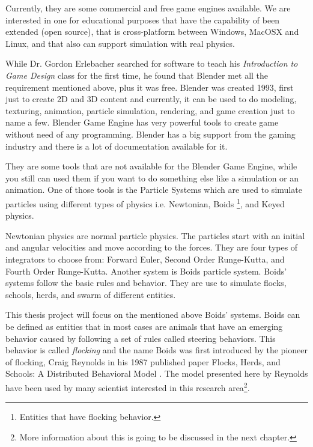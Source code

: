 
Currently, they are some commercial and free game engines available. We are interested in one for educational purposes that have the capability of been extended (open source), that is cross-platform between Windows, MacOSX and Linux, and that also can support simulation with real physics. 


While Dr. Gordon Erlebacher searched for software to teach his \textit{Introduction to Game Design} class for the first time, he found that Blender \cite{?} met all the requirement mentioned above, plus it was free. Blender was created 1993, first just to create 2D and 3D content and currently, it can be used to do modeling, texturing, animation, particle simulation, rendering, and game creation just to name a few. Blender Game Engine has very powerful tools to create game without need of any programming. Blender has a big support from the gaming industry and there is a lot of documentation available for it.  


They are some tools that are not available for the Blender Game Engine, while you still can used them if you want to do something else like a simulation or an animation. One of those tools is the Particle Systems which are used to simulate particles using different types of physics i.e. Newtonian, Boids \footnote{Entities that have flocking behavior.}, and Keyed physics. 



Newtonian physics are normal particle physics. The particles start with an initial and angular velocities and move according to the forces. They are four types of integrators to choose from: Forward Euler, Second Order Runge-Kutta, and Fourth Order Runge-Kutta. Another system is Boids particle system. Boids' systems follow the basic rules and behavior. They are use to simulate flocks, schools, herds, and swarm of different entities.

This thesis project will focus on the mentioned above Boids' systems. Boids can be defined as entities that in most cases are animals that have an emerging behavior caused by following a set of rules called steering behaviors. This behavior is called \textit{flocking} and the name Boids was first introduced by the pioneer of flocking, Craig Reynolds in his 1987 published paper Flocks, Herds, and Schools: A Distributed Behavioral Model \cite{craig1}. The model presented here by Reynolds have been used by many scientist interested in this research area\footnote{More information about this is going to be discussed in the next chapter.}.

